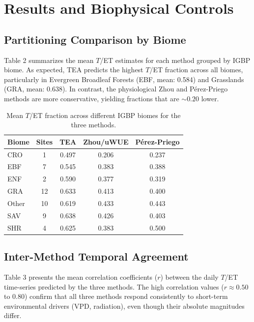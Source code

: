 \documentclass[11pt,a4paper]{article}
\begin{document}
\section{Results and Biophysical Controls}

\subsection{Partitioning Comparison by Biome}
Table 2 summarizes the mean $T$/ET estimates for each method grouped by IGBP biome. As expected, TEA predicts the highest $T$/ET fraction across all biomes, particularly in Evergreen Broadleaf Forests (EBF, mean: 0.584) and Grasslands (GRA, mean: 0.638). In contrast, the physiological Zhou and P\'erez-Priego methods are more conservative, yielding fractions that are $\sim0.20$ lower.

\begin{table}[h!]
\centering
\caption{Mean $T$/ET fraction across different IGBP biomes for the three methods.}
\begin{tabular}{lcccc}
\toprule
Biome & Sites & TEA & Zhou/uWUE & P\'erez-Priego \\
\midrule
CRO & 1 & 0.497 & 0.206 & 0.237 \\
EBF & 7 & 0.545 & 0.383 & 0.388 \\
ENF & 2 & 0.590 & 0.377 & 0.319 \\
GRA & 12 & 0.633 & 0.413 & 0.400 \\
Other & 10 & 0.619 & 0.433 & 0.443 \\
SAV & 9 & 0.638 & 0.426 & 0.403 \\
SHR & 4 & 0.625 & 0.383 & 0.500 \\
\bottomrule
\end{tabular}
\end{table}

\subsection{Inter-Method Temporal Agreement}
Table 3 presents the mean correlation coefficients ($r$) between the daily $T$/ET time-series predicted by the three methods. The high correlation values ($r \approx 0.50$ to $0.80$) confirm that all three methods respond consistently to short-term environmental drivers (VPD, radiation), even though their absolute magnitudes differ.
\end{document}
